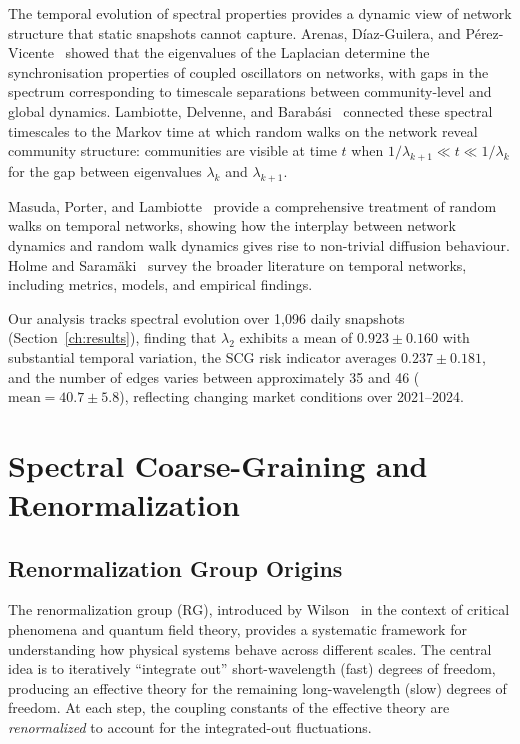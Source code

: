 The temporal evolution of spectral properties provides a dynamic view of
network structure that static snapshots cannot capture.  Arenas,
D\'iaz-Guilera, and P\'erez-Vicente~\cite{arenas2006synchronization}
showed that the eigenvalues of the Laplacian determine the
synchronisation properties of coupled oscillators on networks, with
gaps in the spectrum corresponding to timescale separations between
community-level and global dynamics.  Lambiotte, Delvenne, and
Barab\'asi~\cite{lambiotte2014random} connected these spectral
timescales to the Markov time at which random walks on the network
reveal community structure: communities are visible at time $t$ when
$1/\lambda_{k+1} \ll t \ll 1/\lambda_k$ for the gap between eigenvalues
$\lambda_k$ and $\lambda_{k+1}$.

Masuda, Porter, and Lambiotte~\cite{masuda2017random} provide a
comprehensive treatment of random walks on temporal networks, showing
how the interplay between network dynamics and random walk dynamics
gives rise to non-trivial diffusion behaviour.  Holme and
Saram\"aki~\cite{holme2012temporal} survey the broader literature on
temporal networks, including metrics, models, and empirical findings.

Our analysis tracks spectral evolution over 1{,}096 daily snapshots
(Section~\ref{ch:results}), finding that $\lambda_2$ exhibits a mean
of $0.923 \pm 0.160$ with substantial temporal variation, the SCG risk
indicator averages $0.237 \pm 0.181$, and the number of edges varies
between approximately 35 and 46 ($\text{mean} = 40.7 \pm 5.8$),
reflecting changing market conditions over 2021--2024.


\section{Spectral Coarse-Graining and Renormalization}
\label{sec:scg_background}

\subsection{Renormalization Group Origins}
\label{sec:rg_origins}

The renormalization group (RG), introduced by Wilson~\cite{wilson1975renormalization}
in the context of critical phenomena and quantum field theory, provides a
systematic framework for understanding how physical systems behave across
different scales.  The central idea is to iteratively ``integrate out''
short-wavelength (fast) degrees of freedom, producing an effective theory
for the remaining long-wavelength (slow) degrees of freedom.  At each
step, the coupling constants of the effective theory are
\emph{renormalized} to account for the integrated-out fluctuations.

